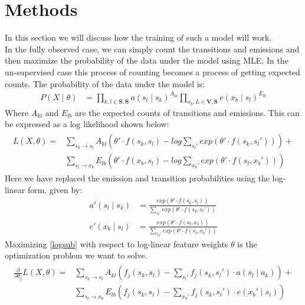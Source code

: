 \documentclass[11pt]{article}
\begin{document}
\section{Methods}
In this section we will discuss how the training of such a model will work. \\
In the fully observed case, we can simply count the transitions and emissions and then 
maximize the probability of the data under the model using MLE. In the un-supervised case this process of counting becomes a process of getting expected counts. The probability of the data under the model is:
\begin{align}
P(X \mid \theta) &= \prod_{ k,l \in \mathbf{S,S}} a(s_l \mid s_k)^{A_{kl}}
\prod_{ x_b,L \in \mathbf{V,S}}e(x_b \mid s_l)^{E_{lb}}\label{eq2}
\end{align}
Where $A_{kl}$ and $E_{lb}$ are the expected counts of transitions and emissions. This can be expressed as a log likelihood shown below:\\
\begin{align}
\begin{split}
L(X,\theta) =& \sum_{s_k \rightarrow s_l} A_{kl} (\theta' \cdot f(s_k, s_l) -
log \sum_{s_l'} exp( \theta' \cdot f(s_k, s_l'))) + \\
& \sum_{s_l \rightarrow x_b} E_{lb} (\theta' \cdot f(x_b, s_l) - log\sum_{x_b'}
exp(\theta' \cdot f(s_l, x_b'))) \label{eq:logsub}
\end{split}
\end{align}
Here we have replaced the emission and transition probabilities using the log-linear form, given by:
\begin{align}
a'(s_l \mid s_k) &= \frac{exp(\theta' \cdot f(s_k, s_l))}{\sum_{s_l'}
exp(\theta' \cdot f(s_k,s_l'))} \label{eq:probakl}\\
e'(x_b \mid s_l) &= \frac{exp(\theta' \cdot
f(s_l, x_b))}{\sum_{x_b'} exp(\theta' \cdot f(s_l, x_b'))} \label{eq:probelb}
\end{align}
Maximizing \ref{logsub} with respect to log-linear feature weights $\theta$ is the optimization problem we want to solve.
\begin{align}
\begin{split}
\frac{\partial}{\partial\theta_j} L(X,\theta) =&  \sum_{s_k \rightarrow s_l} A_{kl}
(f_j(s_k, s_l) - \sum_{s_l'} f_j(s_k,s_l') \cdot a(s_l\mid a_k)) +\\
& \sum_{s_l \rightarrow x_b} E_{lb}(f_j(s_k, s_l) - \sum_{x_b'} f_j(s_k,s_l')
\cdot e(x_b' \mid s_l)) \label{eq:grad}
\end{split}
\end{align}
\end{document}
